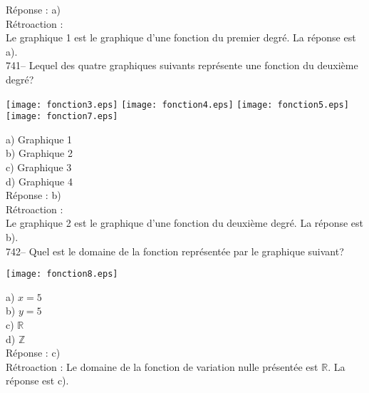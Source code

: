 ﻿\documentclass[letterpaper, 12pt]{article}
\begin{document}
R\'eponse : a)\\

R\'etroaction : \\
Le graphique 1 est le graphique d'une fonction du premier degr\'e.  La
r\'eponse est a).\\

741-- Lequel des quatre graphiques suivants repr\'esente une fonction du
deuxi\`eme degr\'e?\\
    \begin{center}
    \texttt{[image: fonction3.eps]}
\texttt{[image: fonction4.eps]}
\texttt{[image: fonction5.eps]}
\texttt{[image: fonction7.eps]}

    \end{center}
a) Graphique 1\\
b) Graphique 2\\
c) Graphique 3\\
d) Graphique 4\\

R\'eponse : b)\\

R\'etroaction : \\
Le graphique 2 est le graphique d'une fonction du deuxi\`eme degr\'e.  La
r\'eponse est b).\\

742-- Quel est le domaine de la fonction repr\'esent\'ee par le graphique
suivant?

    \begin{center}
    \texttt{[image: fonction8.eps]}
    \end{center}
a) $x=5$\\
b) $y=5$\\
c) $\mathbb{R}$\\
d) $\mathbb{Z}$\\

R\'eponse : c)\\

R\'etroaction :
Le domaine de la fonction de variation nulle pr\'esent\'ee est $\mathbb{R}$.
  La r\'eponse est c).\\
\end{document}
